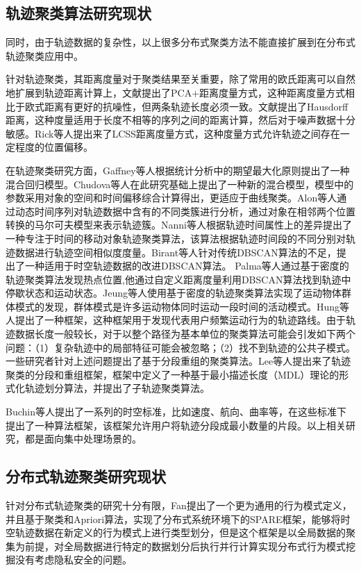 \subsection{轨迹聚类算法研究现状}
同时，由于轨迹数据的复杂性，以上很多分布式聚类方法不能直接扩展到在分布式轨迹聚类应用中。

针对轨迹聚类，其距离度量对于聚类结果至关重要，除了常用的欧氏距离可以自然地扩展到轨迹距离计算上，文献提出了PCA+距离度量方式，这种距离度量方式相比于欧式距离有更好的抗噪性，但两条轨迹长度必须一致。文献提出了Hausdorff距离，这种度量适用于长度不相等的序列之间的距离计算，然后对于噪声数据十分敏感。Rick等人提出来了LCSS距离度量方式，这种度量方式允许轨迹之间存在一定程度的位置偏移。

在轨迹聚类研究方面，Gaffney等人根据统计分析中的期望最大化原则提出了一种混合回归模型。Chudova等人在此研究基础上提出了一种新的混合模型，模型中的参数采用对象的空间和时间偏移综合计算得出，更适应于曲线聚类。Alon等人通过动态时间序列对轨迹数据中含有的不同类簇进行分析，通过对象在相邻两个位置转换的马尔可夫模型来表示轨迹簇。Nanni等人根据轨迹时间属性上的差异提出了一种专注于时间的移动对象轨迹聚类算法，该算法根据轨迹时间段的不同分别对轨迹数据进行轨迹空间相似度度量。Birant等人针对传统DBSCAN算法的不足，提出了一种适用于时空轨迹数据的改进DBSCAN算法。
Palma等人通过基于密度的轨迹聚类算法发现热点位置,他通过自定义距离度量利用DBSCAN算法找到轨迹中停歇状态和运动状态。Jeung等人使用基于密度的轨迹聚类算法实现了运动物体群体模式的发现，群体模式是许多运动物体同时运动一段时间的活动模式。Hung等人提出了一种框架，这种框架用于发现代表用户频繁运动行为的轨迹路线。由于轨迹数据长度一般较长，对于以整个路径为基本单位的聚类算法可能会引发如下两个问题：（1）复杂轨迹中的局部特征可能会被忽略；（2）找不到轨迹的公共子模式。一些研究者针对上述问题提出了基于分段重组的聚类算法。Lee等人提出来了轨迹聚类的分段和重组框架，框架中定义了一种基于最小描述长度（MDL）理论的形式化轨迹划分算法，并提出了子轨迹聚类算法。

Buchin等人提出了一系列的时空标准，比如速度、航向、曲率等，在这些标准下提出了一种算法框架，该框架允许用户将轨迹分段成最小数量的片段。以上相关研究，都是面向集中处理场景的。

\subsection{分布式轨迹聚类研究现状}
针对分布式轨迹聚类的研究十分有限，Fan提出了一个更为通用的行为模式定义，并且基于聚类和Apriori算法，实现了分布式系统环境下的SPARE框架，能够将时空轨迹数据在新定义的行为模式上进行类型划分，但是这个框架是以全局数据的聚集为前提，对全局数据进行特定的数据划分后执行并行计算实现分布式行为模式挖掘没有考虑隐私安全的问题。


